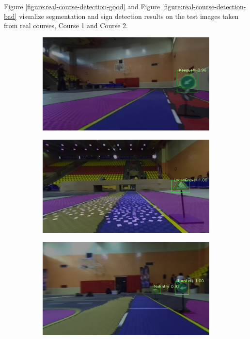Figure \ref{figure:real-course-detection-good} and Figure
\ref{figure:real-course-detection-bad} visualize segmentation and sign
detection results on the test images taken from real courses, Course 1 and
Course 2.

\begin{figure}[h]
  \centering
  \begin{subfigure}[b]{0.45\linewidth}
    \includegraphics[width=\linewidth]{figures/experiments/real/keepleft.jpg}
  \end{subfigure}
  \begin{subfigure}[b]{0.45\linewidth}
    \includegraphics[width=\linewidth]{figures/experiments/real/loosegravel.jpg}
  \end{subfigure}
  \begin{subfigure}[b]{0.45\linewidth}
    \includegraphics[width=\linewidth]{figures/experiments/real/noentry.jpg}

\end{subfigure}
\end{figure}
